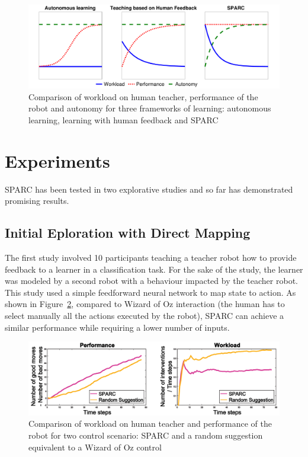 \documentclass[conference]{IEEEtran}
\begin{document}
\begin{figure}
    \centering
    \includegraphics[width=0.9\linewidth]{motivation.pdf}
    \caption{Comparison of workload on human teacher, performance of the robot
    and autonomy for three frameworks of learning: autonomous learning, learning
    with human feedback and SPARC}
    \label{fig:comparison}
\end{figure}

\section{Experiments}

SPARC has been tested in two explorative studies and so far has demonstrated
promising results.

\subsection{Initial Eploration with Direct Mapping}

The first study \cite{senft2015sparc} involved 10 participants teaching a teacher robot how to provide
feedback to a learner in a classification task. For the sake of the study, the
learner was modeled by a second robot with a behaviour impacted by the teacher
robot. This study used a simple feedforward neural network to map state to
action. As shown in Figure~\ref{fig:ICSR}, compared to Wizard of Oz interaction
(the human has to select manually all the actions executed by the robot), SPARC
can achieve a similar performance while requiring a lower number of inputs.

\begin{figure}
    \centering
    \includegraphics[width=0.9\linewidth]{ICSR.pdf}
    \caption{Comparison of workload on human teacher and performance of the robot
    for two control scenario: SPARC and a random suggestion equivalent to a
    Wizard of Oz control}
    \label{fig:ICSR}
\end{figure}
\end{document}
